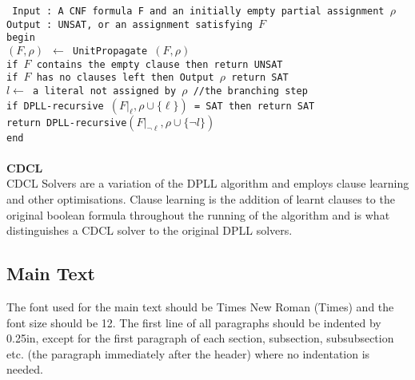 \documentclass[12pt,a4paper]{article}
\begin{document}
\texttt{
Input : A CNF formula F and an initially empty partial assignment $\rho$ \\
Output : UNSAT, or an assignment satisfying $F$\\
begin\\
\hspace*{1cm}$(F,\rho)$ $\leftarrow$ UnitPropagate $(F,\rho)$\\
\hspace*{1cm}if $F$ contains the empty clause then return UNSAT\\
\hspace*{1cm}if $F$ has no clauses left then Output $\rho$ return SAT\\
\hspace*{1cm}$l \leftarrow$ a literal not assigned by $\rho$  //the branching step \\
\hspace*{1cm}if DPLL-recursive $(F |_\ell,\rho \cup \{\ell\})$ = SAT then return SAT\\
\hspace*{1cm}return DPLL-recursive$(F |_{\neg\ell},\rho \cup \{\neg l \})$ \\
end
}\\\\
{\bf CDCL}\\
CDCL Solvers are a variation of the DPLL algorithm and employs clause learning and other optimisations. Clause learning is the addition of learnt clauses to the original boolean formula throughout the running of the algorithm and is what distinguishes a CDCL solver to the original DPLL solvers.



\subsection{Main Text}

The font used for the main text should be Times New Roman (Times) and the font size should be 12.  The first line of all paragraphs should be indented by 0.25in, except for the first paragraph of each section, subsection, subsubsection etc. (the paragraph immediately after the header) where no indentation is needed.
\end{document}
